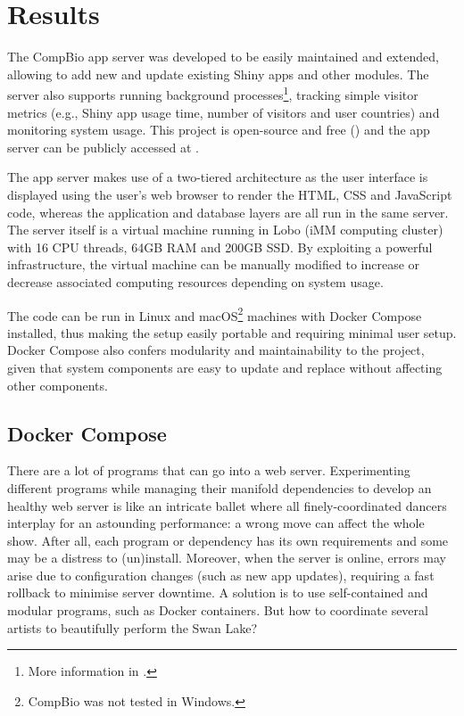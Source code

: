 \section{Results}

The CompBio app server was developed to be easily maintained and extended, allowing to add new and update existing Shiny apps and other modules. The server also supports running background processes\footnote{More information in .}, tracking simple visitor metrics (e.g., Shiny app usage time, number of visitors and user countries) and monitoring system usage. This project is open-source and free () and the app server can be publicly accessed at .

The app server makes use of a two-tiered architecture as the user interface is displayed using the user's web browser to render the HTML, CSS and JavaScript code, whereas the application and database layers are all run in the same server. The server itself is a virtual machine running in Lobo (iMM computing cluster) with 16 CPU threads, 64GB RAM and 200GB SSD. By exploiting a powerful infrastructure, the virtual machine can be manually modified to increase or decrease associated computing resources depending on system usage.

The code can be run in Linux and macOS\footnote{CompBio was not tested in Windows.} machines with Docker Compose installed, thus making the setup easily portable and requiring minimal user setup. Docker Compose also confers modularity and maintainability to the project, given that system components are easy to update and replace without affecting other components.

\subsection{Docker Compose}

There are a lot of programs that can go into a web server. Experimenting different programs while managing their manifold dependencies to develop an healthy web server is like an intricate ballet where all finely-coordinated dancers interplay for an astounding performance: a wrong move can affect the whole show. After all, each program or dependency has its own requirements and some may be a distress to (un)install. Moreover, when the server is online, errors may arise due to configuration changes (such as new app updates), requiring a fast rollback to minimise server downtime. A solution is to use self-contained and modular programs, such as Docker containers. But how to coordinate several artists to beautifully perform the Swan Lake?

